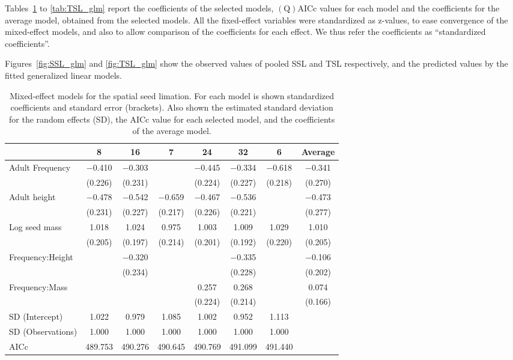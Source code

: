\documentclass[A4]{article}
\begin{document}
Tables~\ref{tab:SSL} to \ref{tab:TSL_glm} report the coefficients of
the selected models, $\mathrm{(Q)AICc}$ values for each model and the
coefficients for the average model, obtained from the selected
models. All the fixed-effect variables were standardized as z-values,
to ease convergence of the mixed-effect models, and also to allow
comparison of the coefficients for each effect. We thus refer the
coefficients as ``standardized coefficients''.

Figures~\ref{fig:SSL_glm} and \ref{fig:TSL_glm} show the observed
values of pooled SSL and TSL respectively, and the
predicted values by the fitted generalized linear models.

%

\begin{table}
\caption{Mixed-effect models for the spatial seed limation. For each
  model is shown standardized coefficients and standard error
  (brackets). Also shown the estimated standard deviation for the
  random effects (SD), the AICc value for each selected model, and the
  coefficients of the average model.}
\centering
\begin{tabular}[t]{lccccccc}
\toprule
  & 8 & 16 & 7 & 24 & 32 & 6 & Average\\
\midrule
Adult Frequency & \num{-0.410} & \num{-0.303} &  & \num{-0.445} & \num{-0.334} & \num{-0.618} & \num{-0.341}\\
 & (\num{0.226}) & (\num{0.231}) &  & (\num{0.224}) & (\num{0.227}) & (\num{0.218}) & (\num{0.270})\\
Adult height & \num{-0.478} & \num{-0.542} & \num{-0.659} & \num{-0.467} & \num{-0.536} &  & \num{-0.473}\\
 & (\num{0.231}) & (\num{0.227}) & (\num{0.217}) & (\num{0.226}) & (\num{0.221}) &  & (\num{0.277})\\
Log seed mass & \num{1.018} & \num{1.024} & \num{0.975} & \num{1.003} & \num{1.009} & \num{1.029} & \num{1.010}\\
 & (\num{0.205}) & (\num{0.197}) & (\num{0.214}) & (\num{0.201}) & (\num{0.192}) & (\num{0.220}) & (\num{0.205})\\
Frequency:Height &  & \num{-0.320} &  &  & \num{-0.335} &  & \num{-0.106}\\
 &  & (\num{0.234}) &  &  & (\num{0.228}) &  & (\num{0.202})\\
Frequency:Mass &  &  &  & \num{0.257} & \num{0.268} &  & \num{0.074}\\
 &  &  &  & (\num{0.224}) & (\num{0.214}) &  & (\num{0.166})\\
SD (Intercept) & \num{1.022} & \num{0.979} & \num{1.085} & \num{1.002} & \num{0.952} & \num{1.113} & \\
SD (Observations) & \num{1.000} & \num{1.000} & \num{1.000} & \num{1.000} & \num{1.000} & \num{1.000} & \\
\midrule
AICc & \num{489.753} & \num{490.276} & \num{490.645} & \num{490.769} & \num{491.099} & \num{491.440} & \\
\bottomrule
\end{tabular}
\label{tab:SSL}
\end{table}
\end{document}
